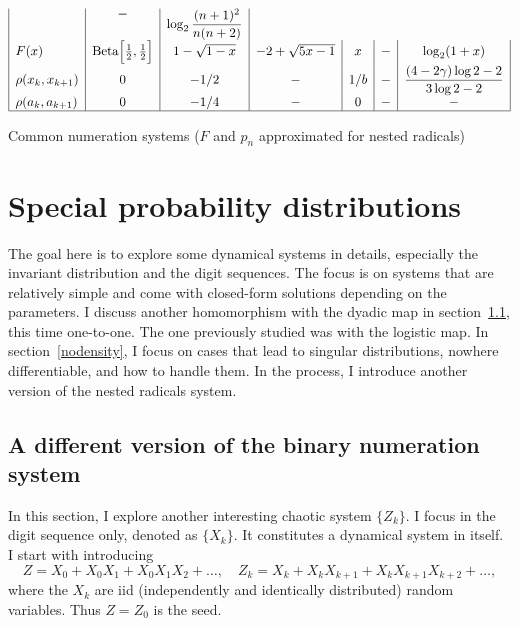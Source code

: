 \documentclass[oneside,10pt]{book}
\begin{document}
\begin{table}[H]
\[\begin{array}{|l|c|c|c|c|c|c|}
  &  \shortstack{$-$ \\ \textcolor{white}{xx}}
  & \log_2\mathlarger{\frac{(n+1)^2}{n(n+2)}}\\[4pt]
F(x) & \text{Beta}\Big[\frac{1}{2},\frac{1}{2}\Big] 
 & 1-\sqrt{1-x} 
 &  -2 + \sqrt{5x-1}
 & x & - & \log_2(1+x)\\[4pt]
 \rho(x_k, x_{k+1}) & 0 & -1/2 & - & 1/b & - 
 &  \mathlarger{ \frac{(4-2\gamma)\log 2 - 2}{3\log 2 - 2} }\\
\rho(a_k,a_{k+1}) & 0 & -1/4 & - & 0 & - & - \\
\hline
\end{array}
\]
\caption{\label{ttyttuchi} Common numeration systems ($F$ and  $p_n$ approximated for nested radicals)}
\end{table}





\section{Special probability distributions}\label{gorexcres}

The goal here is to explore some dynamical systems in details, especially the invariant distribution and the digit sequences.
 The focus is on systems that are relatively simple and come with closed-form solutions depending on the parameters.
 I discuss another homomorphism with the dyadic map in section~\ref{scrotew}, this time one-to-one. The one previously studied was with the logistic map. In section~\ref{nodensity}, I focus on cases that lead to singular distributions, nowhere differentiable, and how to handle them.
 In the process, I introduce another version of the nested radicals system.


\subsection{A different version of the binary numeration system}\label{scrotew}

In this section, I explore another interesting chaotic system $\{Z_k\}$. 
I focus in the digit sequence only,  denoted as $\{X_k\}$. It constitutes a dynamical system in itself. 
I start with introducing 
\begin{equation}
Z = X_0 + X_0 X_1 +X_0 X_1 X_2 + \dots, \quad Z_k = X_k + X_k X_{k+1} +X_k X_{k+1} X_{k+2} + \dots,\label{digere}
\end{equation}
where the $X_k$ are iid (independently and identically distributed) random variables. Thus $Z=Z_0$ is the \textcolor{index}{seed}.
\end{document}
